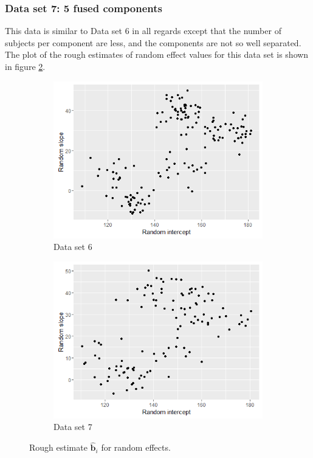 \subsubsection{Data set 7: 5 fused components}
\label{subsubsec : ds_5fused}
This data is similar to Data set 6 in all regards except that the number of subjects per component are less, and the components are not so well separated. The plot of the rough estimates of random effect values for this data set is shown in figure \ref{fig : ds_5fused_randplot}.

\begin{figure}[!htb]
\centering
\captionsetup{justification=centering}
\begin{subfigure}[b]{0.4\textwidth}
		\includegraphics[width=\textwidth]{mainmatter/chapter_5_simulation_study/ds_5wellsep_randplot.png}
        \caption{\label{fig : ds_5wellsep_randplot}Data set 6}
	\end{subfigure}
	\begin{subfigure}[b]{0.4\textwidth}
		\includegraphics[width=\textwidth]{mainmatter/chapter_5_simulation_study/ds_5fused_randplot.png}
        \caption{\label{fig : ds_5fused_randplot}Data set 7}
	\end{subfigure}
	\caption{Rough estimate $\boldsymbol{\hat{b}}_i$ for random effects.}
	\label{fig : ds_5wellsep_5fused}    
\end{figure}


